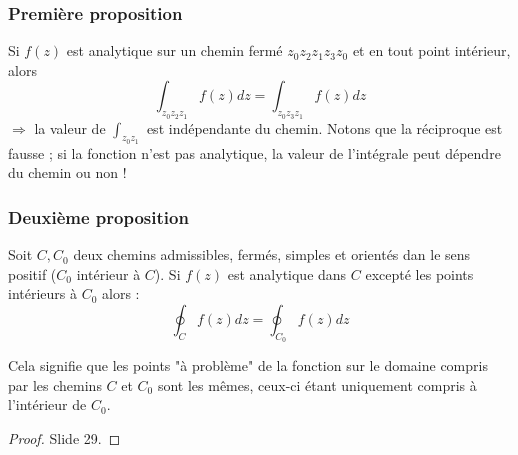         \subsubsection{Première proposition}
        Si $f(z)$ est analytique sur un chemin fermé $z_0z_2z_1z_3z_0$ et en tout point
        intérieur, alors
        \begin{equation}
        \int_{z_0z_2z_1} f(z) dz = \int_{z_0z_3z_1} f(z) dz
        \end{equation}
        $\Rightarrow$ la valeur de $\int_{z_0z_1}$ est indépendante du chemin. Notons
        que la réciproque est fausse ; si la fonction n'est pas analytique, la valeur
        de l'intégrale peut dépendre du chemin ou non !\\
        
        
        \subsubsection{Deuxième proposition}
        Soit $C, C_0$ deux chemins admissibles, fermés, simples et orientés dan le sens
        positif ($C_0$ intérieur à $C$). Si $f(z)$ est analytique dans $C$ excepté les
        points intérieurs à $C_0$ alors :
        \begin{equation}
        \oint_C f(z) dz = \oint_{C_0} f(z) dz
        \end{equation}
        
        Cela signifie que les points "à problème" de la fonction sur le domaine compris par les chemins $C$ et $C_0$ sont les mêmes, ceux-ci étant uniquement compris à l'intérieur de $C_0$.
        
        \begin{proof}
        Slide 29.
        \end{proof}
        
